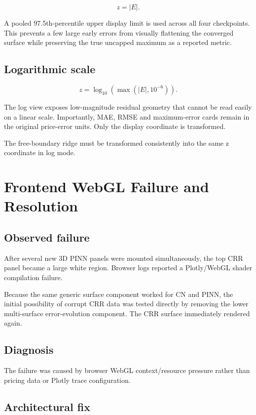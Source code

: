 \documentclass[11pt,a4paper]{article}
\begin{document}
\[
z=|E|.
\]

A pooled 97.5th-percentile upper display limit is used across all four checkpoints. This prevents a few large early errors from visually flattening the converged surface while preserving the true uncapped maximum as a reported metric.

\subsection{Logarithmic scale}

\[
z=\log_{10}(\max(|E|,10^{-6})).
\]

The log view exposes low-magnitude residual geometry that cannot be read easily on a linear scale. Importantly, MAE, RMSE and maximum-error cards remain in the original price-error units. Only the display coordinate is transformed.

The free-boundary ridge must be transformed consistently into the same z coordinate in log mode.

\section{Frontend WebGL Failure and Resolution}

\subsection{Observed failure}

After several new 3D PINN panels were mounted simultaneously, the top CRR panel became a large white region. Browser logs reported a Plotly/WebGL shader compilation failure.

Because the same generic surface component worked for CN and PINN, the initial possibility of corrupt CRR data was tested directly by removing the lower multi-surface error-evolution component. The CRR surface immediately rendered again.

\subsection{Diagnosis}

The failure was caused by browser WebGL context/resource pressure rather than pricing data or Plotly trace configuration.

\subsection{Architectural fix}
\end{document}
